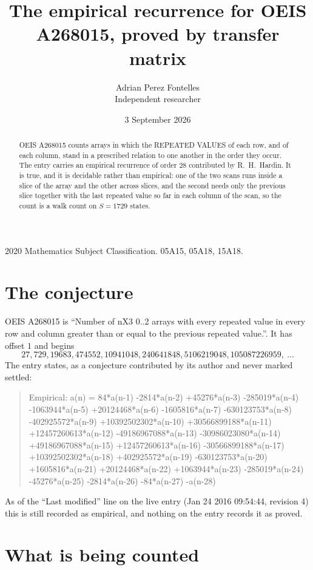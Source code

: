 \documentclass[11pt,a4paper]{article}
\title{The empirical recurrence for OEIS A268015, proved by transfer matrix}
\author{Adrian Perez Fontelles\\ \small Independent researcher}
\date{3 September 2026}
\theoremstyle{plain}
\theoremstyle{definition}
\begin{document}
\maketitle

\begin{abstract}
OEIS A268015 counts arrays in which the REPEATED VALUES of each row, and of each column, stand in a
prescribed relation to one another in the order they occur. The entry carries an empirical
recurrence of order $28$ contributed by R.~H.~Hardin. It is true, and it is decidable
rather than empirical: one of the two scans runs inside a slice of the array and the other
across slices, and the second needs only the previous slice together with the last repeated
value so far in each column of the scan, so the count is a walk count on $S=1729$ states.
\end{abstract}

\noindent\small 2020 Mathematics Subject Classification. 05A15, 05A18, 15A18.\normalsize

\section{The conjecture}

OEIS A268015 is ``Number of nX3 0..2 arrays with every repeated value in every row and column greater than or equal to the previous repeated value.''. It has offset $1$ and begins
\[
27, 729, 19683, 474552, 10941048, 240641848, 5106219048, 105087226959,\ \dots
\]
The entry states, as a conjecture contributed by its author and never marked settled:
\begin{quote}
Empirical: a(n) = 84*a(n-1) -2814*a(n-2) +45276*a(n-3) -285019*a(n-4) -1063944*a(n-5) +20124468*a(n-6) -1605816*a(n-7) -630123753*a(n-8) -402925572*a(n-9) +10392502302*a(n-10) +30566899188*a(n-11) +12457260613*a(n-12) -49186967088*a(n-13) -30986023080*a(n-14) +49186967088*a(n-15) +12457260613*a(n-16) -30566899188*a(n-17) +10392502302*a(n-18) +402925572*a(n-19) -630123753*a(n-20) +1605816*a(n-21) +20124468*a(n-22) +1063944*a(n-23) -285019*a(n-24) -45276*a(n-25) -2814*a(n-26) -84*a(n-27) -a(n-28)
\end{quote}
As of the ``Last modified'' line on the live entry (Jan 24 2016 09:54:44, revision 4) this is still
recorded as empirical, and nothing on the entry records it as proved.

\section{What is being counted}
\end{document}
